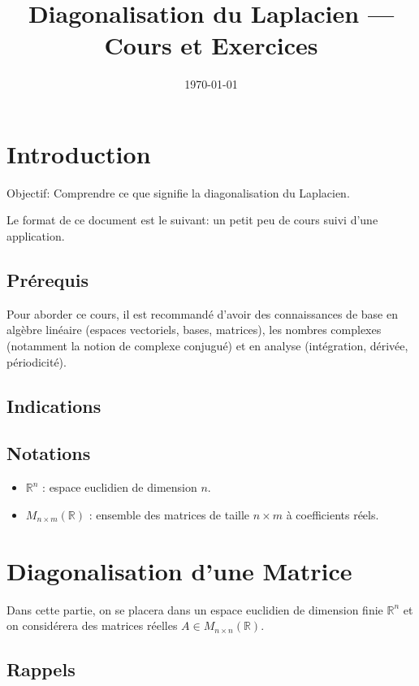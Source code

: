 \documentclass[11pt,a4paper]{article}
\title{Diagonalisation du Laplacien — Cours et Exercices}
\author{
}
\date{\today}
\numberwithin{equation}{section}
\theoremstyle{plain}
\theoremstyle{definition}
\theoremstyle{remark}
\newcommand{\R}{\mathbb{R}}
\begin{document}
\maketitle
\tableofcontents

\section{Introduction}
Objectif: Comprendre ce que signifie la diagonalisation du Laplacien.

Le format de ce document est le suivant: un petit peu de cours suivi d'une application.

\subsection{Prérequis}
Pour aborder ce cours, il est recommandé d'avoir des connaissances de base en algèbre linéaire (espaces vectoriels, bases, matrices), les nombres complexes (notamment la notion de complexe conjugué) et en analyse (intégration, dérivée, périodicité).

\subsection{Indications}

\subsection{Notations}

\begin{itemize}
    \item $\R^n$ : espace euclidien de dimension $n$.
    \item $M_{n \times m}(\R)$ : ensemble des matrices de taille $n \times m$ à coefficients réels.
\end{itemize}

\section{Diagonalisation d'une Matrice}

Dans cette partie, on se placera dans un espace euclidien de dimension finie $\R^n$ et on considérera des matrices réelles $A \in M_{n \times n}(\R)$.

\subsection{Rappels}
\end{document}
